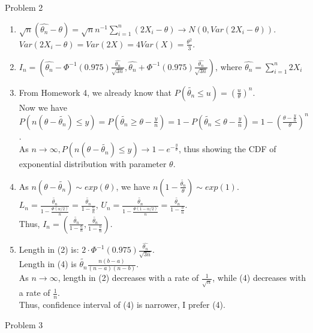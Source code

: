 \documentclass[12pt,letterpaper, onecolumn]{exam}
\begin{document}
\begin{questions}
    \question Problem 2
    \begin{solution}
        \begin{enumerate}
            \item $\sqrt{n}(\hat{\theta_n}-\theta) = \sqrt{n}n^{-1}\sum_{i=1}^n (2X_i-\theta) \rightarrow N(0, Var(2X_i-\theta))$. \\ 
            $Var(2X_i-\theta) = Var(2X) = 4Var(X) = \frac{\theta^2}{3}$.
            \item $I_n = (\hat{\theta_n}-\Phi^{-1}(0.975)\frac{\hat{\theta_n}}{\sqrt{3n}},\hat{\theta_n}+\Phi^{-1}(0.975)\frac{\hat{\theta_n}}{\sqrt{3n}})$, where $\hat{\theta_n} = \sum_{i=1}^n 2X_i$
            \item From Homework 4, we already know that $P(\tilde{\theta_n} \leq u) = (\frac{u}{\theta})^n$. \\Now we have $P(n(\theta-\tilde{\theta_n}) \leq y) = P (\tilde{\theta_n} \geq \theta - \frac{y}{n}) = 1-P(\tilde{\theta_n} \leq \theta - \frac{y}{n}) = 1 - (\frac{\theta-\frac{y}{n}}{\theta})^n$.\\
        As $n \rightarrow \infty, P(n(\theta-\tilde{\theta_n}) \leq y) \rightarrow 1-e^{-\frac{y}{\theta}}$, thus showing the CDF of exponential distribution with parameter $\theta$.
        \item  As $n(\theta-\tilde{\theta_n}) \sim exp(\theta)$, we have $n(1-\frac{\tilde{\theta_n}}{\theta}) \sim exp(1)$.\\ $L_n = \frac{\tilde{\theta_n}}{1-\frac{\Phi(\alpha/2)}{n}} =  \frac{\tilde{\theta_n}}{1-\frac{a}{n}}$, $U_n =  \frac{\tilde{\theta_n}}{1-\frac{\Phi(1-\alpha/2)}{n}} =  \frac{\tilde{\theta_n}}{1-\frac{b}{n}}$. \\Thus, $I_n = (\frac{\tilde{\theta_n}}{1-\frac{a}{n}}, \frac{\tilde{\theta_n}}{1-\frac{b}{n}})$.
        \item Length in (2) is: $2 \cdot \Phi^{-1}(0.975)\frac{\hat{\theta_n}}{\sqrt{3n}}$. \\ Length in (4) is $\tilde{\theta_n}\frac{n(b-a)}{(n-a)(n-b)}$. \\ As $n\rightarrow\infty$, length in (2) decreases with a rate of $\frac{1}{\sqrt{n}}$, while (4) decreases with a rate of $\frac{1}{n}$. \\ Thus, confidence interval of (4) is narrower, I prefer (4).
        \end{enumerate}
    \end{solution}
    \question Problem 3
    \begin{solution}
        \begin{enumerate}

\end{enumerate}
\end{solution}
\end{questions}
\end{document}
